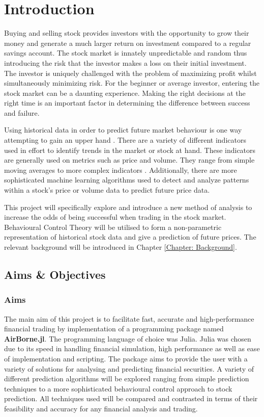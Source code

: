 \chapter{Introduction}
\label{chapter: Intro}

Buying and selling stock provides investors with the opportunity to grow their money and generate a much larger return on investment compared to a regular savings account. The stock market is innately unpredictable and random thus introducing the risk that the investor makes a loss on their initial investment. The investor is uniquely challenged with the problem of maximizing profit whilst simultaneously minimizing risk. For the beginner or average investor, entering the stock market can be a daunting experience. Making the right decisions at the right time is an important factor in determining the difference between success and failure.  

\noindent Using historical data in order to predict future market behaviour is one way attempting to gain an upper hand \cite{tech_analysis}. There are a variety of different indicators used in effort to identify trends in the market or stock at hand. These indicators are generally used on metrics such as price and volume. They range from simple moving averages to more complex indicators \cite{tech_indic}. Additionally, there are more sophisticated machine learning algorithms used to detect and analyze patterns within a stock's price or volume data to predict future price data.

\noindent This project will specifically explore and introduce a new method of analysis to increase the odds of being successful when trading in the stock market. Behavioural Control Theory will be utilised to form a non-parametric representation of historical stock data and give a prediction of future prices. The relevant background will be introduced in Chapter \ref{Chapter: Background}.

\section{Aims \& Objectives}

\subsection {Aims}

\noindent The main aim of this project is to facilitate fast, accurate and high-performance financial trading by implementation of a programming package named \textbf{AirBorne.jl}. The programming language of choice was Julia. Julia was chosen due to its speed in handling financial simulation, high performance as well as ease of implementation and scripting. The package aims to provide the user with a variety of solutions for
analysing and predicting financial securities. A variety of different prediction algorithms will be explored ranging from simple prediction techniques to a more sophisticated behavioural control approach to stock prediction. All techniques used will be compared and contrasted in terms of their feasibility and accuracy for any financial analysis and trading. 

